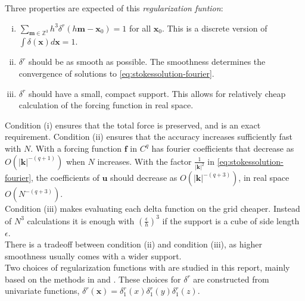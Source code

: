 \documentclass[a4paper,
twoside=false,abstract=false,numbers=noenddot,
titlepage=false,headings=small,parskip=half,version=last]{scrartcl}
\begin{document}
Three properties are expected of this \emph{regularization funtion}:
\begin{enumerate}[(i)]
\item $\sum_{\mathbf{m}\in \mathbb{Z}^3}h^3\delta^{r}(h\mathbf{m}-\mathbf{x}_0) = 1$ for all $\mathbf{x}_0$. This is a discrete version of $\int \delta(\mathbf{x}) d\mathbf{x}=1$.
\item $\delta^{r}$ should be as smooth as possible. The smoothness determines the convergence of solutions to \eqref{eq:stokessolution-fourier}.
\item $\delta^{r}$ should have a small, compact support. This allows for relatively cheap calculation of the forcing function in real space.
\end{enumerate}
Condition (i) ensures that the total force is preserved, and is an exact requirement.
Condition (ii) ensures that the accuracy increases sufficiently fast with $N$.
With a forcing function $\mathbf{f}$ in $C^q$ has fourier coefficients that decrease as $O(|\mathbf{k}|^{-(q+1)})$ when $N$ increases.
With the factor $\frac{1}{|\mathbf{k}|^2}$ in \eqref{eq:stokessolution-fourier}, the coefficients of $\mathbf{u}$ should decrease as $O(|\mathbf{k}|^{-(q+3)})$, in real space $O(N^{-(q+3)})$.\\
Condition (iii) makes evaluating each delta function on the grid cheaper. Instead of $N^3$ calculations it is enough with $\left(\frac{\epsilon}{h}\right)^3$ if the support is a cube of side length $\epsilon$.\\
There is a tradeoff between condition (ii) and condition (iii), as higher smoothness usually comes with a wider support.\\
Two choices of regularization functions with are studied in this report, mainly based on the methods in \cite{spectralewald} and \cite{interfaceregularization}.
These choices for $\delta^{r}$ are constructed from univariate functions, $\delta^{r}(\mathbf{x}) = \delta^{r}_{1}(x) \delta^{r}_{1}(y) \delta^{r}_{1}(z)$.

\end{document}
